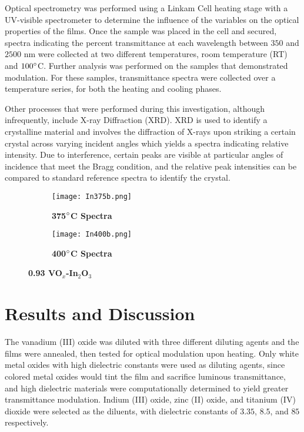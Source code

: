 \documentclass[a4paper]{article}
\begin{document}
Optical spectrometry was performed using a Linkam Cell heating stage with a UV-visible spectrometer to determine the influence of the variables on the optical properties of the films. Once the sample was placed in the cell and secured, spectra indicating the percent transmittance at each wavelength between $350$ and $2500$ nm were collected at two different temperatures, room temperature (RT) and $100\degree $C. Further analysis was performed on the samples that demonstrated modulation. For these samples, transmittance spectra were collected over a temperature series, for both the heating and cooling phases.

Other processes that were performed during this investigation, although infrequently, include X-ray Diffraction (XRD). XRD is used to identify a crystalline material and involves the diffraction of X-rays upon striking a certain crystal across varying incident angles which yields a spectra indicating relative intensity. Due to interference, certain peaks are visible at particular angles of incidence that meet the Bragg condition, and the relative peak intensities can be compared to standard reference spectra to identify the crystal. 


\begin{figure*}
\centering
\begin{subfigure}{.5\textwidth}
  \centering
    \texttt{[image: In375b.png]}
    \caption{\textbf{375$\degree$C Spectra}}
    \label{In375}
\end{subfigure}%
\begin{subfigure}{.5\textwidth}
  \centering
    \texttt{[image: In400b.png]}
    \caption{\textbf{400$\degree$C Spectra}}
    \label{In400}
\end{subfigure}
\caption{\textbf{0.93 VO$_x$-In$_2$O$_3$}}
\label{In}
\end{figure*}


\section{Results and Discussion}
The vanadium (III) oxide was diluted with three different diluting agents and the films were annealed, then tested for optical modulation upon heating. Only white metal oxides with high dielectric constants were used as diluting agents, since colored metal oxides would tint the film and sacrifice luminous transmittance, and high dielectric materials were computationally determined to yield greater transmittance modulation. \cite{li} Indium (III) oxide, zinc (II) oxide, and titanium (IV) dioxide were selected as the diluents, with dielectric constants of $3.35$, $8.5$, and $85$ respectively. 
\end{document}
